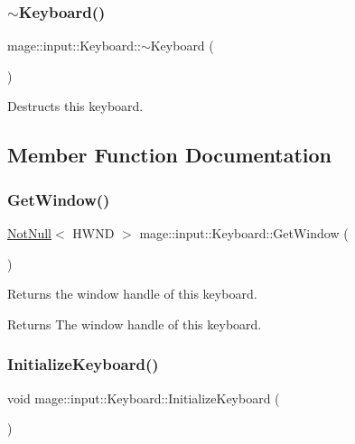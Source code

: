 \subsubsection{\texorpdfstring{$\sim$\+Keyboard()}{~Keyboard()}}
{\footnotesize\ttfamily mage\+::input\+::\+Keyboard\+::$\sim$\+Keyboard (\begin{DoxyParamCaption}{ }\end{DoxyParamCaption})\hspace{0.3cm}{\ttfamily [default]}}

Destructs this keyboard. 

\subsection{Member Function Documentation}
\mbox{\label{classmage_1_1input_1_1_keyboard_a9838f6a7453f74d545926bf5de4c7750}} 
\subsubsection{\texorpdfstring{Get\+Window()}{GetWindow()}}
{\footnotesize\ttfamily \mbox{\hyperlink{namespacemage_a8769f9d670d6b585ea306cb1062af94b}{Not\+Null}}$<$ H\+W\+ND $>$ mage\+::input\+::\+Keyboard\+::\+Get\+Window (\begin{DoxyParamCaption}{ }\end{DoxyParamCaption})\hspace{0.3cm}{\ttfamily [noexcept]}}

Returns the window handle of this keyboard.

\begin{DoxyReturn}{Returns}
The window handle of this keyboard. 
\end{DoxyReturn}
\mbox{\label{classmage_1_1input_1_1_keyboard_a9a764a44144ee846bc5fa8094fa591e2}} 
\subsubsection{\texorpdfstring{Initialize\+Keyboard()}{InitializeKeyboard()}}
{\footnotesize\ttfamily void mage\+::input\+::\+Keyboard\+::\+Initialize\+Keyboard (\begin{DoxyParamCaption}{ }\end{DoxyParamCaption})\hspace{0.3cm}{\ttfamily [private]}}

